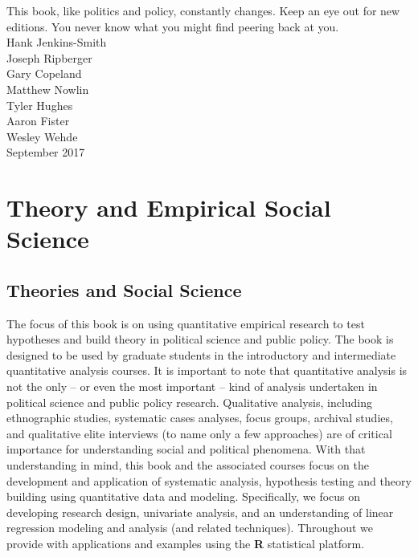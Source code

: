 \documentclass[11pt,openany]{book}\usepackage[]{graphicx}\usepackage[]{color}
\begin{document}
This book, like politics and policy, constantly changes. Keep an eye out for new editions. You never know what you might find peering back at you.\\

\noindent Hank Jenkins-Smith\\
Joseph Ripberger\\
Gary Copeland\\
Matthew Nowlin\\
Tyler Hughes\\
Aaron Fister\\
Wesley Wehde\\


\noindent September 2017









\doublespace 
\part{Theory and Empirical Social Science} 




\chapter{Theories and Social Science}

The focus of this book is on using quantitative empirical research to test hypotheses and build theory in political science and public policy. The book is designed to be used by graduate students in the introductory and intermediate quantitative analysis courses. It is important to note that quantitative analysis is not the only -- or even the most important -- kind of analysis undertaken in political science and public policy research. Qualitative analysis, including ethnographic studies, systematic cases analyses, focus groups, archival studies, and qualitative elite interviews (to name only a few approaches) are of critical importance for understanding social and political phenomena. With that understanding in mind, this book and the associated courses focus on  the development and application of systematic analysis, hypothesis testing and theory building using quantitative data and modeling. Specifically, we focus on developing research design, univariate analysis, and an understanding of linear regression modeling and analysis (and related techniques). Throughout we provide with applications and examples using the \textbf{R} statistical platform. 
\end{document}
